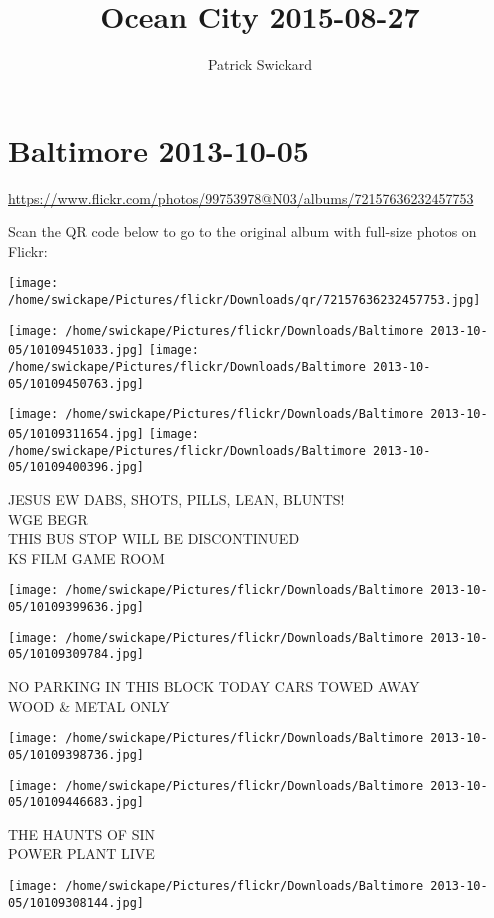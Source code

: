 \documentclass[10pt,letterpaper]{article}
\title{Ocean City 2015-08-27}
\author{Patrick Swickard}
\date{}
\begin{document}
\section*{Baltimore 2013-10-05}

\url{https://www.flickr.com/photos/99753978@N03/albums/72157636232457753}

Scan the QR code below to go to the original album with full-size photos on Flickr:

\texttt{[image: /home/swickape/Pictures/flickr/Downloads/qr/72157636232457753.jpg]}
\pagebreak

\texttt{[image: /home/swickape/Pictures/flickr/Downloads/Baltimore 2013-10-05/10109451033.jpg]}
\texttt{[image: /home/swickape/Pictures/flickr/Downloads/Baltimore 2013-10-05/10109450763.jpg]}

\texttt{[image: /home/swickape/Pictures/flickr/Downloads/Baltimore 2013-10-05/10109311654.jpg]}
\texttt{[image: /home/swickape/Pictures/flickr/Downloads/Baltimore 2013-10-05/10109400396.jpg]}

JESUS EW DABS, SHOTS, PILLS, LEAN, BLUNTS!\\
WGE BEGR\\
THIS BUS STOP WILL BE DISCONTINUED\\
KS FILM GAME ROOM
\pagebreak

\texttt{[image: /home/swickape/Pictures/flickr/Downloads/Baltimore 2013-10-05/10109399636.jpg]}

\vspace{0.25in}
\texttt{[image: /home/swickape/Pictures/flickr/Downloads/Baltimore 2013-10-05/10109309784.jpg]}

NO PARKING IN THIS BLOCK TODAY CARS TOWED AWAY\\
WOOD \& METAL ONLY
\pagebreak

\texttt{[image: /home/swickape/Pictures/flickr/Downloads/Baltimore 2013-10-05/10109398736.jpg]}

\vspace{0.25in}
\texttt{[image: /home/swickape/Pictures/flickr/Downloads/Baltimore 2013-10-05/10109446683.jpg]}

THE HAUNTS OF SIN\\
POWER PLANT LIVE
\pagebreak

\texttt{[image: /home/swickape/Pictures/flickr/Downloads/Baltimore 2013-10-05/10109308144.jpg]}
\end{document}
